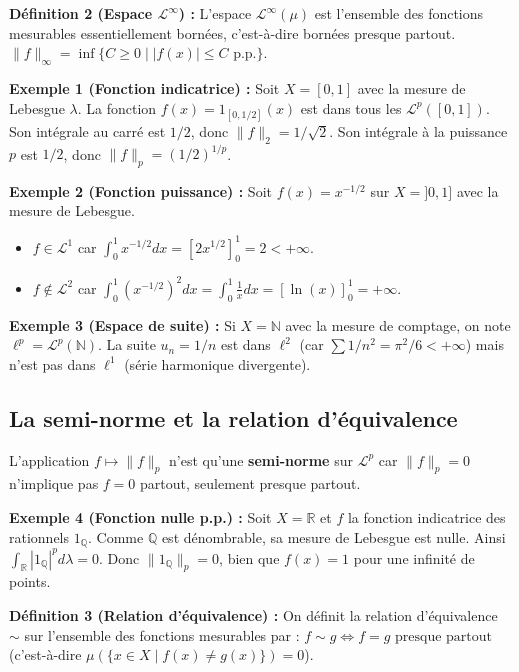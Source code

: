 \documentclass[11pt,a4paper]{article}
\begin{document}
\textbf{Définition 2 (Espace $\mathcal{L}^\infty$) :}
L'espace $\mathcal{L}^\infty(\mu)$ est l'ensemble des fonctions mesurables essentiellement bornées, c'est-à-dire bornées presque partout.
$\|f\|_\infty = \inf \{ C \ge 0 \mid |f(x)| \le C \text{ p.p.} \}$.

\textbf{Exemple 1 (Fonction indicatrice) :} Soit $X=[0,1]$ avec la mesure de Lebesgue $\lambda$. La fonction $f(x) = 1_{[0, 1/2]}(x)$ est dans tous les $\mathcal{L}^p([0,1])$. Son intégrale au carré est $1/2$, donc $\|f\|_2 = 1/\sqrt{2}$. Son intégrale à la puissance $p$ est $1/2$, donc $\|f\|_p = (1/2)^{1/p}$.

\textbf{Exemple 2 (Fonction puissance) :} Soit $f(x) = x^{-1/2}$ sur $X=]0, 1]$ avec la mesure de Lebesgue.
\begin{itemize}\item $f \in \mathcal{L}^1$ car $\int_0^1 x^{-1/2} dx = [2x^{1/2}]_0^1 = 2 < +\infty$.
\item $f \notin \mathcal{L}^2$ car $\int_0^1 (x^{-1/2})^2 dx = \int_0^1 \frac{1}{x} dx = [\ln(x)]_0^1 = +\infty$.\end{itemize}

\textbf{Exemple 3 (Espace de suite) :} Si $X = \mathbb{N}$ avec la mesure de comptage, on note $\ell^p = \mathcal{L}^p(\mathbb{N})$. La suite $u_n = 1/n$ est dans $\ell^2$ (car $\sum 1/n^2 = \pi^2/6 < +\infty$) mais n'est pas dans $\ell^1$ (série harmonique divergente).

\subsection{La semi-norme et la relation d'équivalence}

L'application $f \mapsto \|f\|_p$ n'est qu'une \textbf{semi-norme} sur $\mathcal{L}^p$ car $\|f\|_p = 0$ n'implique pas $f=0$ partout, seulement presque partout.

\textbf{Exemple 4 (Fonction nulle p.p.) :} Soit $X = \mathbb{R}$ et $f$ la fonction indicatrice des rationnels $1_{\mathbb{Q}}$.
Comme $\mathbb{Q}$ est dénombrable, sa mesure de Lebesgue est nulle. Ainsi $\int_{\mathbb{R}} |1_{\mathbb{Q}}|^p d\lambda = 0$. Donc $\|1_{\mathbb{Q}}\|_p = 0$, bien que $f(x)=1$ pour une infinité de points.

\textbf{Définition 3 (Relation d'équivalence) :}
On définit la relation d'équivalence $\sim$ sur l'ensemble des fonctions mesurables par :
$f \sim g \iff f = g \text{ presque partout}$ (c'est-à-dire $\mu(\{x \in X \mid f(x) \neq g(x)\}) = 0$).
\end{document}
